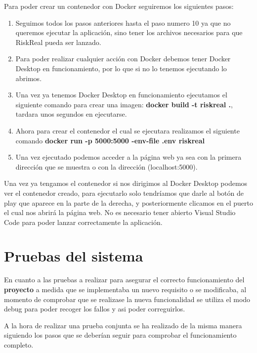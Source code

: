 Para poder crear un contenedor con Docker seguiremos los siguientes pasos:
\begin{enumerate}
    \item Seguimos todos los pasos anteriores hasta el paso numero 10 ya que no queremos ejecutar la aplicación, sino tener los archivos necesarios para que RiskReal pueda ser lanzado.
    \item Para poder realizar cualquier acción con Docker debemos tener Docker Desktop en funcionamiento, por lo que si no lo tenemos ejecutando lo abrimos.
    \item Una vez ya tenemos Docker Desktop en funcionamiento ejecutamos el siguiente comando para crear una imagen: \textbf{docker build -t riskreal .}, tardara unos segundos en ejecutarse.
    \item Ahora para crear el contenedor el cual se ejecutara realizamos el siguiente comando \textbf{docker run -p 5000:5000 \text{-}-env-file .env riskreal}
    \item Una vez ejecutado podemos acceder a la página web ya sea con la primera dirección que se muestra o con la dirección (localhost:5000).
\end{enumerate}

Una vez ya tengamos el contenedor si nos dirigimos al Docker Desktop podemos ver el contenedor creado, para ejecutarlo solo tendríamos que darle al botón de play que aparece en la parte de la derecha, y posteriormente clicamos en el puerto el cual nos abrirá la página web. No es necesario tener abierto Visual Studio Code para poder lanzar correctamente la aplicación.
\section{Pruebas del sistema}
En cuanto a las pruebas a realizar para asegurar el correcto funcionamiento del \textbf{proyecto} a medida que se implementaba un nuevo requisito o se modificaba, al momento de comprobar que se realizase la nueva funcionalidad se utiliza el modo debug para poder recoger los fallos y asi poder correguirlos.

A la hora de realizar una prueba conjunta se ha realizado de la misma manera siguiendo los pasos que se deberían seguir para comprobar el funcionamiento completo.
 